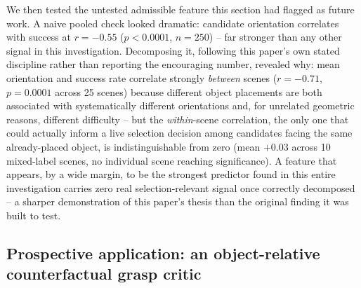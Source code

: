 \documentclass[journal]{IEEEtran}
\begin{document}
We then tested the untested admissible feature this section had flagged
as future work. A naive pooled check looked dramatic: candidate
orientation correlates with success at $r=-0.55$ ($p{<}0.0001$, $n{=}250$)
-- far stronger than any other signal in this investigation. Decomposing
it, following this paper's own stated discipline rather than reporting
the encouraging number, revealed why: mean orientation and success rate
correlate strongly \emph{between} scenes ($r=-0.71$, $p{=}0.0001$ across
25 scenes) because different object placements are both associated with
systematically different orientations and, for unrelated geometric
reasons, different difficulty -- but the \emph{within}-scene correlation,
the only one that could actually inform a live selection decision among
candidates facing the same already-placed object, is indistinguishable
from zero (mean $+0.03$ across 10 mixed-label scenes, no individual scene
reaching significance). A feature that appears, by a wide margin, to be
the strongest predictor found in this entire investigation carries zero
real selection-relevant signal once correctly decomposed -- a sharper
demonstration of this paper's thesis than the original finding it was
built to test.

\subsection{Prospective application: an object-relative counterfactual grasp critic}
\label{sec:critic}
\end{document}
